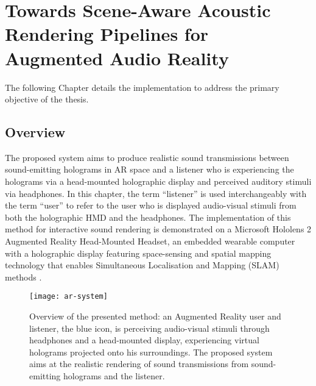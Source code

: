 \chapter{Towards Scene-Aware Acoustic Rendering Pipelines for Augmented Audio Reality}\label{ch:ar-pipeline}%
The following Chapter details the implementation to address the primary objective of the thesis.

\section{Overview}\label{sec:overview}
The proposed system aims to produce realistic sound transmissions between sound-emitting holograms in AR space and a listener who is experiencing the holograms via a head-mounted holographic display and perceived auditory stimuli via headphones. In this chapter, the term ``listener'' is used interchangeably with the term ``user'' to refer to the user who is displayed audio-visual stimuli from both the holographic HMD and the headphones. The implementation of this method for interactive sound rendering is demonstrated on a Microsoft Hololens 2 Augmented Reality Head-Mounted Headset, an embedded wearable computer with a holographic display featuring space-sensing and spatial mapping technology that enables Simultaneous Localisation and Mapping (SLAM) methods \cite{davison2003real, ungureanu2020hololens}.

\begin{figure}[htb]
    \centering
    \texttt{[image: ar-system]}
    \caption{Overview of the presented method: an Augmented Reality user and listener, the blue icon, is perceiving audio-visual stimuli through headphones and a head-mounted display, experiencing virtual holograms projected onto his surroundings. The proposed system aims at the realistic rendering of sound transmissions from sound-emitting holograms and the listener.}
\label{fig:method-overview}
\end{figure}

